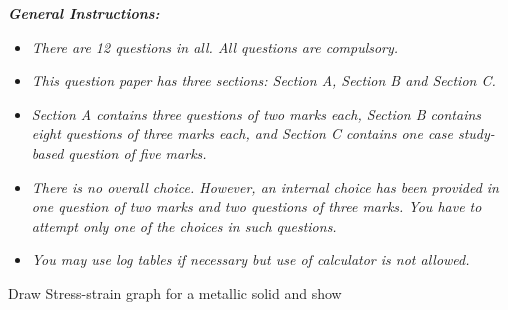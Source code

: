 \documentclass[10pt, a4paper, twoside]{exam}
\begin{document}
\begin{multicols*}{2}
    
    \noindent \textbf{\textit{General Instructions:}}
    \begin{itemize}
      \setlength{\itemsep}{1pt}
      \setlength{\parskip}{0pt}
      \setlength{\parsep}{0pt}
      \item \textit{There are 12 questions in all. All questions are compulsory.}
      \item \textit{This question paper has three sections: Section A, Section B and Section C.}
      \item \textit{Section A contains three questions of two marks each, Section B contains eight questions of three marks each, and Section C contains one case study-based question of five marks.}
      \item \textit{There is no overall choice. However, an internal choice has been provided in one question of two marks and two questions of three marks. You have to attempt only one of the choices in such questions.}
      \item \textit{You may use log tables if necessary but use of calculator is not allowed.}
    \end{itemize}
    \hline{\hfill}
    \noindent 
    
    \begin{questions}
    
        \question Draw Stress-strain graph for a metallic solid and show
    
    

\end{questions}
\end{multicols*}
\end{document}
